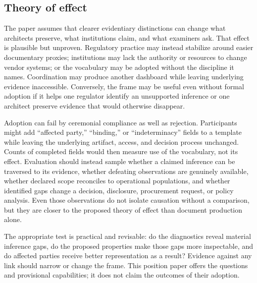 \subsection{Theory of effect}

The paper assumes that clearer evidentiary distinctions can change what
architects preserve, what institutions claim, and what examiners ask. That
effect is plausible but unproven. Regulatory practice may instead stabilize
around easier documentary proxies; institutions may lack the authority or
resources to change vendor systems; or the vocabulary may be adopted without
the discipline it names. Coordination may produce another dashboard while
leaving underlying evidence inaccessible. Conversely, the frame may be useful even without
formal adoption if it helps one regulator identify an unsupported inference or
one architect preserve evidence that would otherwise disappear.

Adoption can fail by ceremonial compliance as well as rejection. Participants
might add ``affected party,'' ``binding,'' or ``indeterminacy'' fields to a
template while leaving the underlying artifact, access, and decision process
unchanged. Counts of completed fields would then measure use of the vocabulary,
not its effect. Evaluation should instead sample whether a claimed inference can
be traversed to its evidence, whether defeating observations are genuinely
available, whether declared scope reconciles to operational populations, and
whether identified gaps change a decision, disclosure, procurement request, or
policy analysis. Even those observations do not isolate causation without a
comparison, but they are closer to the proposed theory of effect than document
production alone.

The appropriate test is practical and revisable: do the diagnostics reveal
material inference gaps, do the proposed properties make those gaps more
inspectable, and do affected parties receive better representation as a result?
Evidence against any link should narrow or change the frame. This position paper
offers the questions and provisional capabilities; it does not claim the
outcomes of their adoption.

